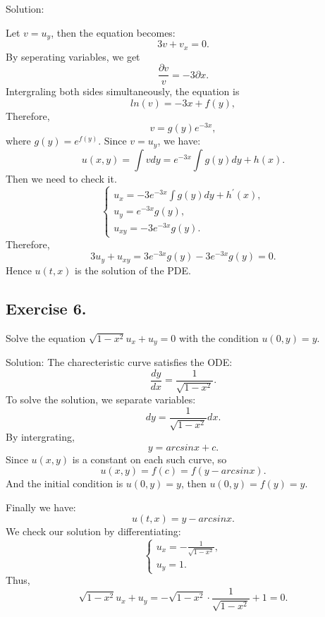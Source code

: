 \documentclass{article}
\begin{document}
			Solution:

			Let $v=u_y$, then the equation becomes:
			\[3v+v_x=0.\]
			By seperating variables, we get \[\frac{\partial v}{v}=-3\partial x.\]
			Intergraling both sides simultaneously, the equation is \[ ln(v) = -3x + f(y),  \]
			Therefore, \[ v = g(y)e^{-3x},\]
			where $g(y)=e^{f(y)}$.
			Since $v=u_y$, we have:
			\[u(x,y)=\int vdy = e^{-3x}\int g(y)dy + h(x).\]
			Then we need to check it.
			\begin{equation*}
				\begin{cases}
					u_{x}=-3e^{-3x}\int g(y)dy + h^{'}(x),
					\\
					u_{y}=e^{-3x} g(y),
					\\
					u_{xy}=-3e^{-3x} g(y).
				\end{cases}
			\end{equation*}
			Therefore, \[3u_y + u_{xy}=3e^{-3x} g(y)-3e^{-3x} g(y)=0.\]
            Hence $u(t,x)$ is the solution of the PDE.


    \subsection{Exercise 6.}
	Solve the equation $\sqrt{1-x^2}u_x+u_y=0$ with the condition $u(0, y)=y.$
		
            Solution: The charecteristic curve satisfies the ODE: 
            \[ \frac{dy}{dx}=\frac{1}{\sqrt{1-x^2}}.\]
			To solve the solution, we separate variables: 		
			\[ dy=\frac{1}{\sqrt{1-x^2}}dx.\]
			By intergrating, \[y= arcsinx + c .\]
			Since $u(x,y)$ is a constant on each such curve, so
			\[ u(x,y)=f(c)=f(y - arcsinx).\]
			And the initial condition is $u(0,y)=y$, then $u(0,y)=f(y)=y.$

			Finally we have:
			\[u(t,x)=y - arcsinx.\]
			We check our solution by differentiating:
			\begin{equation*}
				\begin{cases}
					u_x=-\frac{1}{\sqrt{1-x^2}},
					\\
					u_y=1.
				\end{cases}
			\end{equation*}
			Thus, \[\sqrt{1-x^2}u_x+u_y=-\sqrt{1-x^2} \cdot \frac{1}{\sqrt{1-x^2}}+1=0.\]
\end{document}
